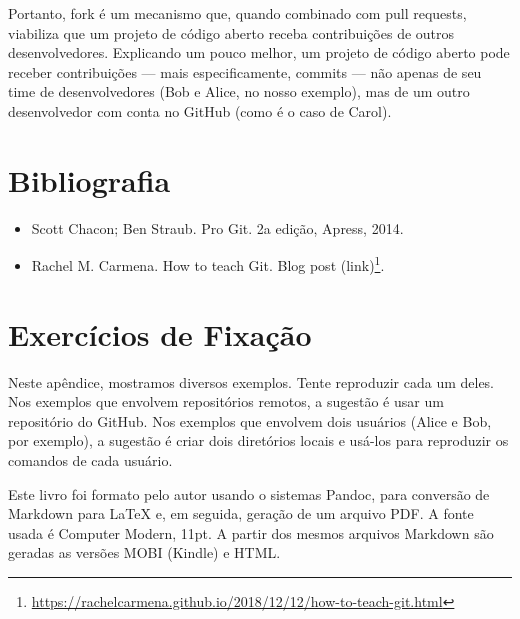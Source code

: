 \documentclass[
  11pt,
  twoside]{book}
\DeclareRobustCommand{\href}[2]{#2\footnote{\url{#1}}}
\begin{document}
Portanto, fork é um mecanismo que, quando combinado com pull requests,
viabiliza que um projeto de código aberto receba contribuições de outros
desenvolvedores. Explicando um pouco melhor, um projeto de código aberto
pode receber contribuições --- mais especificamente, commits --- não
apenas de seu time de desenvolvedores (Bob e Alice, no nosso exemplo),
mas de um outro desenvolvedor com conta no GitHub (como é o caso de
Carol).

\hypertarget{bibliografia-10}{%
\section*{Bibliografia}\label{bibliografia-10}}

\begin{itemize}
\item
  Scott Chacon; Ben Straub. Pro Git. 2a edição, Apress, 2014.
\item
  Rachel M. Carmena. How to teach Git. Blog post
  \href{https://rachelcarmena.github.io/2018/12/12/how-to-teach-git.html}{(link)}.
\end{itemize}

\hypertarget{exercuxedcios-de-fixauxe7uxe3o-10}{%
\section*{Exercícios de
Fixação}\label{exercuxedcios-de-fixauxe7uxe3o-10}}

Neste apêndice, mostramos diversos exemplos. Tente reproduzir cada um
deles. Nos exemplos que envolvem repositórios remotos, a sugestão é usar
um repositório do GitHub. Nos exemplos que envolvem dois usuários (Alice
e Bob, por exemplo), a sugestão é criar dois diretórios locais e usá-los
para reproduzir os comandos de cada usuário.

\small
\printindex

\clearpage
\thispagestyle{empty}
\vspace*{\fill}

Este livro foi formato pelo autor usando o sistemas Pandoc, para
conversão de Markdown para LaTeX e, em seguida, geração de um arquivo
PDF. A fonte usada é Computer Modern, 11pt. A partir dos mesmos arquivos
Markdown são geradas as versões MOBI (Kindle) e HTML.

\backmatter
\end{document}
